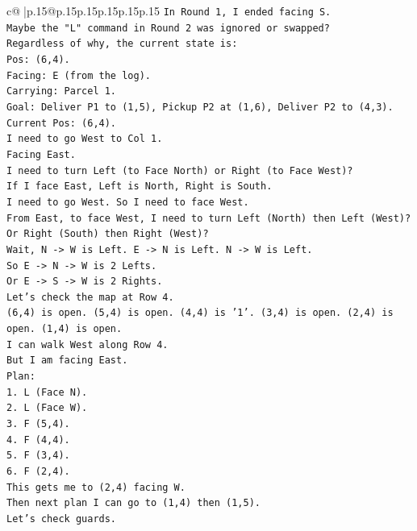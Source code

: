 \documentclass{article}
\begin{document}
{\begin{supertabular}{c@{$\;$}|p{.15\linewidth}@{}p{.15\linewidth}p{.15\linewidth}p{.15\linewidth}p{.15\linewidth}p{.15\linewidth}}
{{{\texttt{In Round 1, I ended facing S.} \\
\texttt{Maybe the "L" command in Round 2 was ignored or swapped?} \\
\texttt{Regardless of why, the current state is:} \\
\texttt{Pos: (6,4).} \\
\texttt{Facing: E (from the log).} \\
\texttt{Carrying: Parcel 1.} \\
\texttt{Goal: Deliver P1 to (1,5), Pickup P2 at (1,6), Deliver P2 to (4,3).} \\
\texttt{Current Pos: (6,4).} \\
\texttt{I need to go West to Col 1.} \\
\texttt{Facing East.} \\
\texttt{I need to turn Left (to Face North) or Right (to Face West)?} \\
\texttt{If I face East, Left is North, Right is South.} \\
\texttt{I need to go West. So I need to face West.} \\
\texttt{From East, to face West, I need to turn Left (North) then Left (West)? Or Right (South) then Right (West)?} \\
\texttt{Wait, N {-}> W is Left. E {-}> N is Left. N {-}> W is Left.} \\
\texttt{So E {-}> N {-}> W is 2 Lefts.} \\
\texttt{Or E {-}> S {-}> W is 2 Rights.} \\
\texttt{Let's check the map at Row 4.} \\
\texttt{(6,4) is open. (5,4) is open. (4,4) is '1'. (3,4) is open. (2,4) is open. (1,4) is open.} \\
\texttt{I can walk West along Row 4.} \\
\texttt{But I am facing East.} \\
\texttt{Plan:} \\
\texttt{1. L (Face N).} \\
\texttt{2. L (Face W).} \\
\texttt{3. F (5,4).} \\
\texttt{4. F (4,4).} \\
\texttt{5. F (3,4).} \\
\texttt{6. F (2,4).} \\
\texttt{This gets me to (2,4) facing W.} \\
\texttt{Then next plan I can go to (1,4) then (1,5).} \\
\texttt{Let's check guards.} \\
}}}
\end{supertabular}}
\end{document}
